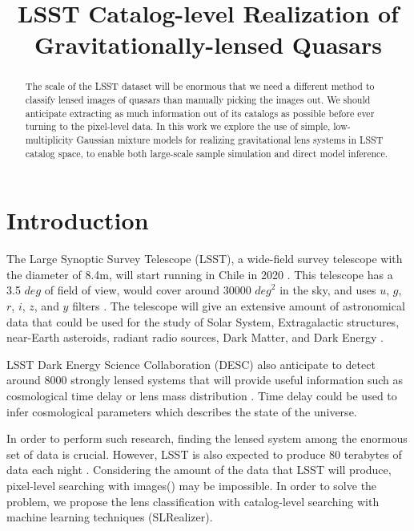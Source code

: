 \documentclass[\docopts]{\docclass}
\begin{document}
\title{ LSST Catalog-level Realization of Gravitationally-lensed Quasars }

\maketitlepre

\begin{abstract}

The scale of the LSST dataset will be enormous that we need a different method to classify lensed images of quasars than manually picking the images out. We should anticipate extracting as much information out of its catalogs as possible before ever turning to the pixel-level data. In this work we explore the use of simple, low-multiplicity Gaussian mixture models for realizing gravitational lens systems in LSST catalog space, to enable both large-scale sample simulation and direct model inference.


\end{abstract}


\maketitlepost


\section{Introduction}
\label{sec:intro}

The Large Synoptic Survey Telescope (LSST), a wide-field survey telescope with the diameter of 8.4m, will start running in Chile in 2020 \cite{LSST_overall}. This telescope has a 3.5 $deg$ of field of view, would cover around 30000 $\textit{deg}^2$ in the sky, and uses $u$, $g$, $r$, $i$, $z$, and $y$ filters \cite{LSSTScienceBookv2}. The telescope will give an extensive amount of astronomical data that could be used for the study of Solar System, Extragalactic structures, near-Earth asteroids, radiant radio sources, Dark Matter, and Dark Energy \cite{LSSTScienceBookv2}. 


LSST Dark Energy Science Collaboration (DESC) also anticipate to detect around 8000 strongly lensed systems that will provide useful information such as cosmological time delay or lens mass distribution \cite{DESC_overall} \cite{TimeDelayOverall} \cite{Twinkles}. Time delay could be used to infer cosmological parameters \cite{Treu2010} which describes the state of the universe.

In order to perform such research, finding the lensed system among the enormous set of data is crucial. However, LSST is also expected to produce 80 terabytes of data each night \cite{LSSTScienceBookv2}.
Considering the amount of the data that LSST will produce, pixel-level searching with images(\cite{RINGFINDER}) may be impossible. In order to solve the problem, we propose the lens classification with catalog-level searching with machine learning techniques (SLRealizer). 
\end{document}
